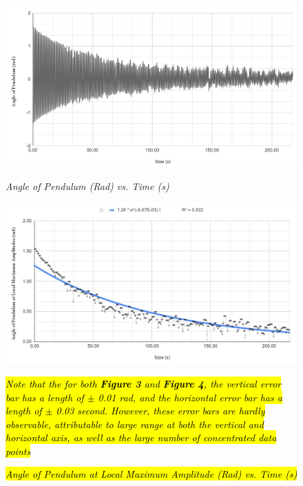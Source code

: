 \documentclass{article}
\begin{document}
\begin{figure}[h]
\begin{minipage}{.5\textwidth}
	\centering
	\includegraphics[scale=0.4]{Pendulum_Decay_Chart1.png}
	\caption{\textit{Angle of Pendulum (Rad) vs. Time (s)}}
	\label{fig_angle}
\end{minipage}%
\begin{minipage}{.5\textwidth}
	\centering
	\includegraphics[scale=0.5]{Pendulum_Decay_Chart2.png}
	
	\caption{\textit{\hl{Angle of Pendulum at Local Maximum Amplitude (Rad) vs. Time (s)}}}
\end{minipage}

	\center \textit{ \hl{Note that the for both \textbf{Figure 3} and \textbf{Figure 4}, the vertical error bar has a length of $\pm$ 0.01 rad, and the horizontal error bar has a length of $\pm$ 0.03 second. However, these error bars are hardly observable, attributable to large range at both the vertical and horizontal axis, as well as the large number of concentrated data points }}
	\label{fig_angle}
\end{figure}
\end{document}
